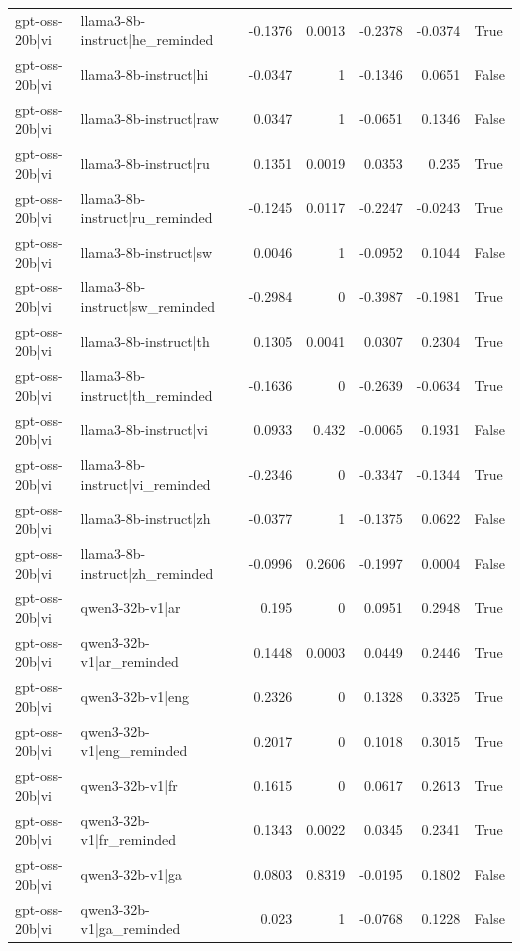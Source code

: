 \begin{table}
\begin{tabular}{l l r r r r l}
gpt-oss-20b|vi & llama3-8b-instruct|he_reminded & -0.1376 & 0.0013 & -0.2378 & -0.0374 & True \\
gpt-oss-20b|vi & llama3-8b-instruct|hi & -0.0347 & 1 & -0.1346 & 0.0651 & False \\
gpt-oss-20b|vi & llama3-8b-instruct|raw & 0.0347 & 1 & -0.0651 & 0.1346 & False \\
gpt-oss-20b|vi & llama3-8b-instruct|ru & 0.1351 & 0.0019 & 0.0353 & 0.235 & True \\
gpt-oss-20b|vi & llama3-8b-instruct|ru_reminded & -0.1245 & 0.0117 & -0.2247 & -0.0243 & True \\
gpt-oss-20b|vi & llama3-8b-instruct|sw & 0.0046 & 1 & -0.0952 & 0.1044 & False \\
gpt-oss-20b|vi & llama3-8b-instruct|sw_reminded & -0.2984 & 0 & -0.3987 & -0.1981 & True \\
gpt-oss-20b|vi & llama3-8b-instruct|th & 0.1305 & 0.0041 & 0.0307 & 0.2304 & True \\
gpt-oss-20b|vi & llama3-8b-instruct|th_reminded & -0.1636 & 0 & -0.2639 & -0.0634 & True \\
gpt-oss-20b|vi & llama3-8b-instruct|vi & 0.0933 & 0.432 & -0.0065 & 0.1931 & False \\
gpt-oss-20b|vi & llama3-8b-instruct|vi_reminded & -0.2346 & 0 & -0.3347 & -0.1344 & True \\
gpt-oss-20b|vi & llama3-8b-instruct|zh & -0.0377 & 1 & -0.1375 & 0.0622 & False \\
gpt-oss-20b|vi & llama3-8b-instruct|zh_reminded & -0.0996 & 0.2606 & -0.1997 & 0.0004 & False \\
gpt-oss-20b|vi & qwen3-32b-v1|ar & 0.195 & 0 & 0.0951 & 0.2948 & True \\
gpt-oss-20b|vi & qwen3-32b-v1|ar_reminded & 0.1448 & 0.0003 & 0.0449 & 0.2446 & True \\
gpt-oss-20b|vi & qwen3-32b-v1|eng & 0.2326 & 0 & 0.1328 & 0.3325 & True \\
gpt-oss-20b|vi & qwen3-32b-v1|eng_reminded & 0.2017 & 0 & 0.1018 & 0.3015 & True \\
gpt-oss-20b|vi & qwen3-32b-v1|fr & 0.1615 & 0 & 0.0617 & 0.2613 & True \\
gpt-oss-20b|vi & qwen3-32b-v1|fr_reminded & 0.1343 & 0.0022 & 0.0345 & 0.2341 & True \\
gpt-oss-20b|vi & qwen3-32b-v1|ga & 0.0803 & 0.8319 & -0.0195 & 0.1802 & False \\
gpt-oss-20b|vi & qwen3-32b-v1|ga_reminded & 0.023 & 1 & -0.0768 & 0.1228 & False \\

\end{tabular}
\end{table}

